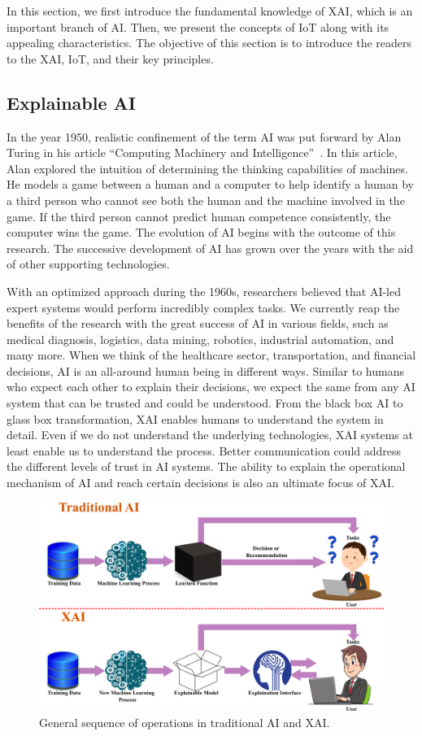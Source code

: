 \documentclass[journal]{IEEEtran}
\begin{document}
In this section, we first introduce the fundamental knowledge of XAI, which is an important branch of AI. Then, we present the concepts of IoT along with its appealing characteristics. The objective of this section is to introduce the readers to the XAI, IoT, and their key principles.

\subsection{Explainable AI} 
In the year 1950, realistic confinement of the term AI was put forward by Alan Turing in his article ``Computing Machinery and Intelligence''~\cite{turing2009computing}. In this article, Alan explored the intuition of determining the thinking capabilities of machines. He models a game between a human and a computer to help identify a human by a third person who cannot see both the human and the machine involved in the game. If the third person cannot predict human competence consistently, the computer wins the game. The evolution of AI begins with the outcome of this research. The successive development of AI has grown over the years with the aid of other supporting technologies.  

With an optimized approach during the 1960s, researchers believed that AI-led expert systems would perform incredibly complex tasks. We currently reap the benefits of the research with the great success of AI in various fields, such as medical diagnosis, logistics, data mining, robotics, industrial automation, and many more. When we think of the healthcare sector, transportation, and financial decisions, AI is an all-around human being in different ways. Similar to humans who expect each other to explain their decisions, we expect the same from any AI system that can be trusted and could be understood. From the black box AI to glass box transformation, XAI enables humans to understand the system in detail. Even if we do not understand the underlying technologies, XAI systems at least enable us to understand the process. Better communication could address the different levels of trust in AI systems. The ability to explain the operational mechanism of AI and reach certain decisions is also an ultimate focus of XAI.  

\begin{figure}
  \centering \includegraphics[width=\textwidth]{figures/AIXAI.png}
   \caption{General sequence of operations in traditional AI and XAI.}
   \label{fig:AIXAI}
\end{figure}
\end{document}
